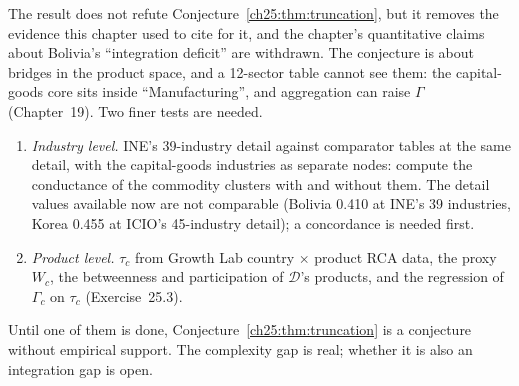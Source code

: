 \documentclass[../structural_economics_book.tex]{subfiles}
\begin{document}
The result does not refute Conjecture~\ref{ch25:thm:truncation}, but it removes the evidence this chapter used to cite for it, and the chapter's quantitative claims about Bolivia's ``integration deficit'' are withdrawn. The conjecture is about bridges in the product space, and a 12-sector table cannot see them: the capital-goods core sits inside ``Manufacturing'', and aggregation can raise $\Gamma$ (Chapter~19). Two finer tests are needed.
\begin{enumerate}
\item \emph{Industry level.} INE's 39-industry detail against comparator tables at the same detail, with the capital-goods industries as separate nodes: compute the conductance of the commodity clusters with and without them. The detail values available now are not comparable (Bolivia 0.410 at INE's 39 industries, Korea 0.455 at ICIO's 45-industry detail); a concordance is needed first.
\item \emph{Product level.} $\tau_c$ from Growth Lab country $\times$ product RCA data, the proxy $W_c$, the betweenness and participation of $\mathcal{D}$'s products, and the regression of $\Gamma_c$ on $\tau_c$ (Exercise~25.3).
\end{enumerate}
Until one of them is done, Conjecture~\ref{ch25:thm:truncation} is a conjecture without empirical support. The complexity gap is real; whether it is also an integration gap is open.
\end{document}
